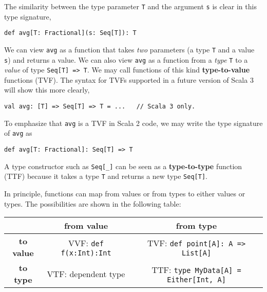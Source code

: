 The similarity between the type parameter \lstinline!T! and the argument
\lstinline!s! is clear in this type signature,
\begin{lstlisting}
def avg[T: Fractional](s: Seq[T]): T
\end{lstlisting}
\begin{comment}
def avg{[}T: Fractional{]}(s : Seq{[}T{]}): T = \{

val frac = implicitly{[}Fractional{[}T{]}{]}

frac.div(s.sum, frac.fromInt(s.length)) 

\}
\end{comment}
We can view \lstinline!avg! as a function that takes \emph{two} parameters
(a type \lstinline!T! and a value \lstinline!s!) and returns a value.
We can also view \lstinline!avg! as a function from a \emph{type}
\lstinline!T! to a \emph{value} of type \lstinline!Seq[T] => T!.
We may call functions of this kind \textbf{type-to-value}
functions (TVF). The syntax for TVFs supported in a future version
of Scala 3 will show this more clearly,
\begin{lstlisting}
val avg: [T] => Seq[T] => T = ...   // Scala 3 only.
\end{lstlisting}
To emphasize that \lstinline!avg! is a TVF in Scala 2 code, we may
write the type signature of \lstinline!avg! as
\begin{lstlisting}
def avg[T: Fractional]: Seq[T] => T
\end{lstlisting}

A type constructor such as \lstinline!Seq[_]! can be seen as a \textbf{type-to-type}
function (TTF) because it takes a type \lstinline!T! and returns
a new type \lstinline!Seq[T]!.

In principle, functions can map from values or from types to either
values or types. The possibilities are shown in the following table:
\begin{center}
\begin{tabular}{|c|c|c|}
\hline 
 & \textbf{\small{}from value} & \textbf{\small{}from type}\tabularnewline
\hline 
\hline 
\textbf{\small{}to value} & VVF: \lstinline!def f(x:Int):Int! & TVF: \lstinline!def point[A]: A => List[A]!\tabularnewline
\hline 
\textbf{\small{}to type} & VTF: dependent type & TTF: \lstinline!type MyData[A] = Either[Int, A]!\tabularnewline
\hline 
\end{tabular}
\par\end{center}

